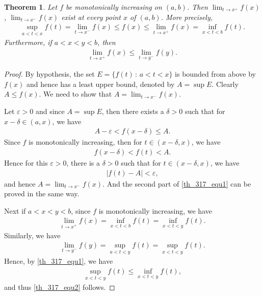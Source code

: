 \documentclass[10pt]{book}
\newtheorem{theorem}{Theorem}[chapter]
\theoremstyle{definition}
\numberwithin{equation}{chapter}
\begin{document}
\begin{theorem}\label{th_317}
Let $f$ be monotonically increasing on $(a,b)$. Then $\lim_{t \to x^{+}} f(x)$, $\lim_{t \to x^{-}} f(x)$ exist at every point $x$ of $(a,b)$. More precisely,
\begin{align}\label{th_317_equ1}
    \sup_{a < t < x} f(t) = \lim_{t \to x^-} f(x) \leq f(x) \leq \lim_{t \to x^+} f(x) = \inf_{x < t < b} f(t).
\end{align}
Furthermore, if $a < x < y < b$, then
\begin{align}\label{th_317_equ2}
    \lim_{t \to x^+} f(x) \leq \lim_{t \to y^-} f(y).
\end{align}
\end{theorem}
\begin{proof}
By hypothesis, the set $E = \{f(t) \,:\, a < t < x\}$ is bounded from above by $f(x)$ and hence has a least upper bound, denoted by $A = \sup E$. Clearly $A \leq f(x)$. We need to show that $A = \lim_{t\to x^-} f(x)$.

Let $\varepsilon > 0$ and since $A = \sup E$, then there exists a $\delta > 0$ such that for $x - \delta \in (a,x)$, we have
\begin{align*}
    A - \varepsilon < f(x - \delta) \leq A.
\end{align*}
Since $f$ is monotonically increasing, then for $t \in (x - \delta, x)$, we have
\begin{align*}
    f(x - \delta) < f(t) < A.
\end{align*}
Hence for this $\varepsilon > 0$, there is a $\delta > 0$ such that for $t \in (x - \delta, x)$, we have
\begin{align*}
    \left|f(t) - A\right| < \varepsilon,
\end{align*}
and hence $A = \lim_{t\to x^-} f(x)$. And the second part of \eqref{th_317_equ1} can be proved in the same way.

Next if $a < x < y < b$, since $f$ is monotonically increasing, we have
\begin{align*}
    \lim_{t\to x^+} f(x) = \inf_{x < t < b} f(t) = \inf_{x < t < y} f(t).
\end{align*}
Similarly, we have
\begin{align*}
    \lim_{t\to y^-} f(y) = \sup_{a < t < y} f(t) = \sup_{x < t < y} f(t).
\end{align*}
Hence, by \eqref{th_317_equ1}, we have
\begin{align*}
    \sup_{x < t < y} f(t) \leq \inf_{x < t < y} f(t),
\end{align*}
and thus \eqref{th_317_equ2} follows.
\end{proof}
\end{document}
